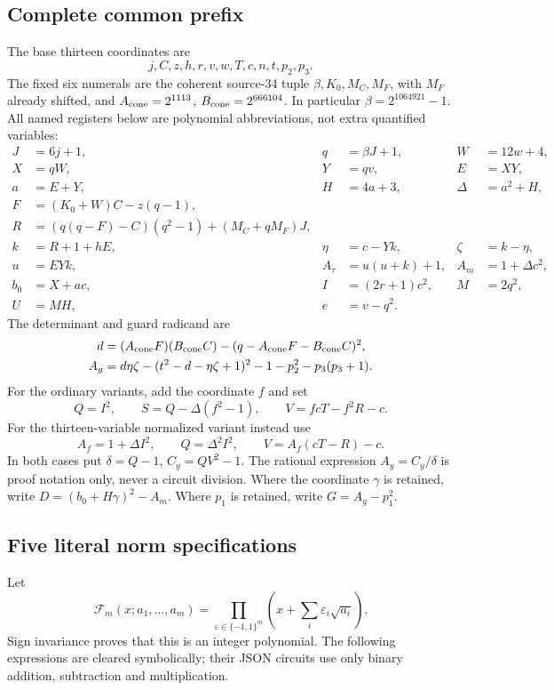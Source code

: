 \subsection{Complete common prefix}
The base thirteen coordinates are
\[
 j,C,z,h,r,v,w,T,c,n,t,p_2,p_3.
\]
The fixed six numerals are the coherent source-34 tuple
$\beta,K_0,M_C,M_F$, with $M_F$ already shifted, and
$A_{\rm cone}=2^{1113}$, $B_{\rm cone}=2^{666104}$.
In particular $\beta=2^{1064921}-1$. All named registers below are
polynomial abbreviations, not extra quantified variables:
\begin{align*}
J&=6j+1,&q&=\beta J+1,&W&=12w+4,\\
X&=qW,&Y&=qv,&E&=XY,\\
a&=E+Y,&H&=4a+3,&\Delta&=a^2+H,\\
F&=(K_0+W)C-z(q-1),&&&\\
R&=(q(q-F)-C)(q^2-1)+(M_C+qM_F)J,&&&\\
k&=R+1+hE,&\eta&=c-Yk,&\zeta&=k-\eta,\\
u&=EYk,&A_\tau&=u(u+k)+1,&A_m&=1+\Delta c^2,\\
b_0&=X+ac,&I&=(2r+1)c^2,&M&=2q^2,\\
U&=MH,&e&=v-q^2.&&
\end{align*}
The determinant and guard radicand are
\begin{align*}
d&=(A_{\rm cone}F)(B_{\rm cone}C)
 -(q-A_{\rm cone}F-B_{\rm cone}C)^2,\\
A_g&=d\eta\zeta-(t^2-d-\eta\zeta+1)^2
     -1-p_2^2-p_3(p_3+1).
\end{align*}
For the ordinary variants, add the coordinate $f$ and set
\[
 Q=I^2,\qquad S=Q-\Delta(f^2-1),\qquad
 V=fcT-f^2R-c.
\]
For the thirteen-variable normalized variant instead use
\[
 A_f=1+\Delta I^2,\qquad Q=\Delta^2I^2,\qquad
 V=A_f(cT-R)-c.
\]
In both cases put $\delta=Q-1$, $C_y=QV^2-1$. The rational expression
$A_y=C_y/\delta$ is proof notation only, never a circuit division.
Where the coordinate $\gamma$ is retained, write
$D=(b_0+H\gamma)^2-A_m$. Where $p_1$ is retained, write
$G=A_g-p_1^2$.

\subsection{Five literal norm specifications}
Let
\[
 \mathcal F_m(x;a_1,\ldots,a_m)
 =\prod_{\varepsilon\in\{-1,1\}^m}
   \left(x+\sum_i\varepsilon_i\sqrt{a_i}\right).
\]
Sign invariance proves that this is an integer polynomial. The following
expressions are cleared symbolically; their JSON circuits use only binary
addition, subtraction and multiplication.


